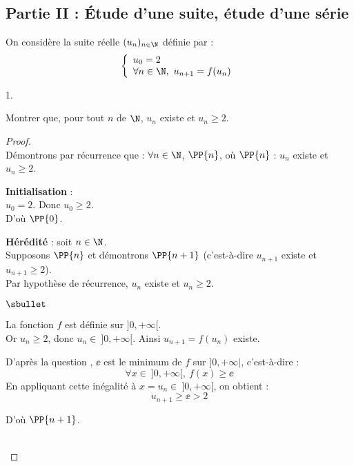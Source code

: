 \documentclass[11pt]{article}%
\begin{document}
\subsection*{Partie II : Étude d'une suite, étude d'une série}
\noindent
On considère la suite réelle $(u_n)_{n\in\N}$ définie par :
\[
\left\{
  \begin{array}{l}
    u_0=2\\
    \forall n \in\N, \ u_{n+1}=f(u_n)
  \end{array}
\right.
\]
\begin{noliste}{1.}
  \setlength{\itemsep}{2mm}
  \setcounter{enumi}{4}
\item Montrer que, pour tout $n$ de $\N$, $u_n$ existe et $u_n\geq 2$.
  
  \begin{proof}~\\
    Démontrons par récurrence que : $\forall n\in\N$, $\PP{n}$, \quad
    où \quad $\PP{n}$ : $u_n$ existe et $u_n\geq 2$.
    \begin{noliste}{\fitem}
    \item {\bf Initialisation} : \\
      $u_0=2$. Donc $u_0\geq 2$.\\
      D'où $\PP{0}$.
      
    \item {\bf Hérédité} : soit $n\in\N$.\\
      Supposons $\PP{n}$ et démontrons $\PP{n+1}$ (c'est-à-dire
      $u_{n+1}$ existe et $u_{n+1}\geq 2$).\\
      Par hypothèse de récurrence, $u_n$ existe et $u_n\geq 2$.
      \begin{noliste}{$\sbullet$}
      \item La fonction $f$ est définie sur $]0,+\infty[$.\\
        Or $u_n \geq 2$, donc $u_n \in \ ]0,+\infty[$. Ainsi $u_{n+1}
        = f(u_n)$ existe.
        
      \item D'après la question , $\ee$ est le minimum de $f$ 
        sur $]0,+\infty|$, c'est-à-dire : 
        \[
        \forall x \in \ ]0,+\infty[, \ f(x) \geq \ee
        \]
        En appliquant cette inégalité à $x = u_n\in \ ]0,+\infty[$, on
        obtient :
        \[
        u_{n+1} \geq \ee > 2
        \]
      \end{noliste}
      D'où $\PP{n+1}$.
    \end{noliste}
     ~\\[-1.2cm]
  \end{proof}
  

\end{noliste}
\end{document}
